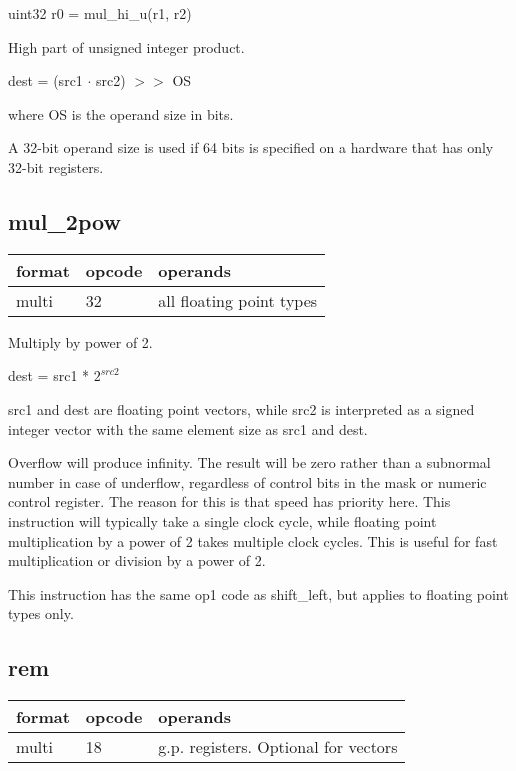 \documentclass[forwardcom.tex]{subfiles}
\begin{document}
uint32 r0 = mul\_hi\_u(r1, r2)
\vv

High part of unsigned integer product.
\vv

dest = (src1 $\cdot$ src2) $>>$ OS

where OS is the operand size in bits.
\vv

A 32-bit operand size is used if 64 bits is specified on a hardware that has only 32-bit registers.
\vv


\subsection{mul\_2pow}
\label{table:mul2PowInstruction}
\begin{tabular}{|p{12mm}|p{15mm}|p{100mm}|}
\hline
\bfseries format & \bfseries opcode & \bfseries operands \\ \hline
multi & 32 & all floating point types \\ \hline
\end{tabular}
\vv

Multiply by power of 2.

dest = src1 * $2^{src2}$

src1 and dest are floating point vectors, while src2 is interpreted as a signed integer vector with the same element size as src1 and dest.
\vv

Overflow will produce infinity. The result will be zero rather than a subnormal number in case of underflow, regardless of control bits in the mask or numeric control register. 
The reason for this is that
speed has priority here. This instruction will typically take a single clock cycle, while floating point multiplication by a power of 2 takes multiple clock cycles. 
This is useful for fast multiplication or division by a power of 2.
\vv

This instruction has the same op1 code as shift\_left, but applies to floating point types only.
\vv


\subsection{rem}
\label{table:remInstruction}
\begin{tabular}{|p{12mm}|p{15mm}|p{100mm}|}
\hline
\bfseries format & \bfseries opcode & \bfseries operands \\ \hline
multi & 18 & g.p. registers. Optional for vectors \\ \hline
\end{tabular}
\vv
\end{document}
